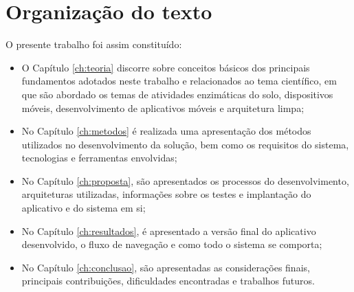 \section{Organização do texto}

O presente trabalho foi assim constituído:
\begin{itemize}
    \item O Capítulo \ref{ch:teoria} discorre sobre conceitos básicos dos principais fundamentos adotados neste trabalho e relacionados ao tema científico, em que são abordado os temas de atividades enzimáticas do solo, dispositivos móveis, desenvolvimento de aplicativos móveis e arquitetura limpa;
    \item No Capítulo \ref{ch:metodos} é realizada uma apresentação dos métodos utilizados no desenvolvimento da solução, bem como os requisitos do sistema, tecnologias e ferramentas envolvidas;
    \item No Capítulo \ref{ch:proposta}, são apresentados os processos do desenvolvimento, arquiteturas utilizadas, informações sobre os testes e implantação do aplicativo e do sistema em si;
    \item No Capítulo \ref{ch:resultados}, é apresentado a versão final do aplicativo desenvolvido, o fluxo de navegação e como todo o sistema se comporta;
    \item No Capítulo \ref{ch:conclusao}, são apresentadas as considerações finais, principais contribuições, dificuldades encontradas e trabalhos futuros.
\end{itemize}
